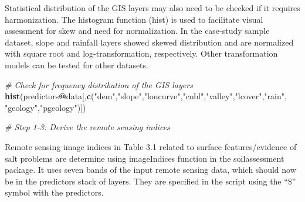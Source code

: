 \documentclass[
  10pt,
  b5paper,
]{book}
\newenvironment{Shaded}{\begin{snugshade}}{\end{snugshade}}
\newcommand{\CommentTok}[1]{\textcolor[rgb]{0.56,0.35,0.01}{\textit{#1}}}
\newcommand{\KeywordTok}[1]{\textcolor[rgb]{0.13,0.29,0.53}{\textbf{#1}}}
\newcommand{\NormalTok}[1]{#1}
\newcommand{\OperatorTok}[1]{\textcolor[rgb]{0.81,0.36,0.00}{\textbf{#1}}}
\newcommand{\StringTok}[1]{\textcolor[rgb]{0.31,0.60,0.02}{#1}}
\begin{document}
\begin{Shaded}
\end{Shaded}

Statistical distribution of the GIS layers may also need to be checked if it requires harmonization. The histogram function (hist) is used to facilitate visual assessment for skew and need for normalization. In the case-study sample dataset, slope and rainfall layers showed skewed distribution and are normalized with square root and log-transformation, respectively. Other transformation models can be tested for other datasets.

\begin{Shaded}
\begin{Highlighting}[]
\CommentTok{# Check for frequency distribution of the GIS layers}
\KeywordTok{hist}\NormalTok{(predictors}\OperatorTok{@}\NormalTok{data[,}\KeywordTok{c}\NormalTok{(}\StringTok{"dem"}\NormalTok{,}\StringTok{"slope"}\NormalTok{,}\StringTok{"loncurve"}\NormalTok{,}\StringTok{"cnbl"}\NormalTok{,}\StringTok{"valley"}\NormalTok{,}\StringTok{"lcover"}\NormalTok{,}\StringTok{"rain"}\NormalTok{,}
                        \StringTok{"geology"}\NormalTok{,}\StringTok{"pgeology"}\NormalTok{)])}


\CommentTok{# Step 1-3: Derive the remote sensing indices}
\end{Highlighting}
\end{Shaded}

Remote sensing image indices in Table 3.1 related to surface features/evidence of salt problems are determine using imageIndices function in the soilassessment package. It uses seven bands of the input remote sensing data, which should now be in the predictors stack of layers. They are specified in the script using the ``\$'' symbol with the predictors.
\end{document}
